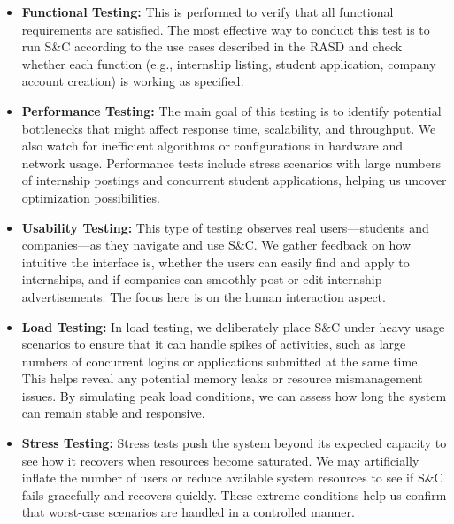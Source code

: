 \begin{itemize}
  \item \textbf{Functional Testing:} 
  This is performed to verify that all functional requirements are satisfied. The most effective way to conduct this test is to run S\&C according to the use cases described in the RASD and check whether each function (e.g., internship listing, student application, company account creation) is working as specified.

  \item \textbf{Performance Testing:} 
  The main goal of this testing is to identify potential bottlenecks that might affect response time, scalability, and throughput. We also watch for inefficient algorithms or configurations in hardware and network usage. Performance tests include stress scenarios with large numbers of internship postings and concurrent student applications, helping us uncover optimization possibilities.

  \item \textbf{Usability Testing:}
  This type of testing observes real users—students and companies—as they navigate and use S\&C. We gather feedback on how intuitive the interface is, whether the users can easily find and apply to internships, and if companies can smoothly post or edit internship advertisements. The focus here is on the human interaction aspect.

  \item \textbf{Load Testing:}
  In load testing, we deliberately place S\&C under heavy usage scenarios to ensure that it can handle spikes of activities, such as large numbers of concurrent logins or applications submitted at the same time. This helps reveal any potential memory leaks or resource mismanagement issues. By simulating peak load conditions, we can assess how long the system can remain stable and responsive.

  \item \textbf{Stress Testing:}
  Stress tests push the system beyond its expected capacity to see how it recovers when resources become saturated. We may artificially inflate the number of users or reduce available system resources to see if S\&C fails gracefully and recovers quickly. These extreme conditions help us confirm that worst-case scenarios are handled in a controlled manner.
\end{itemize}
